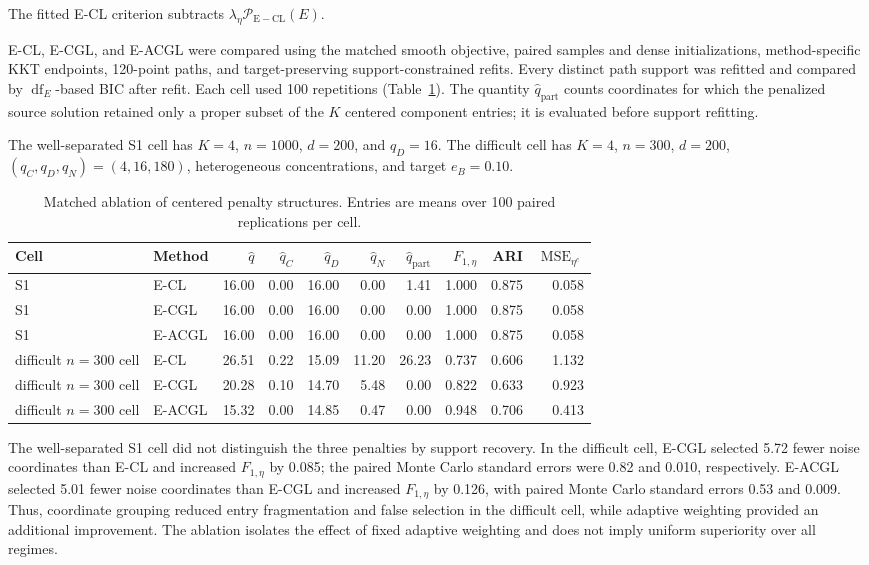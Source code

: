 \documentclass[preprint,12pt,authoryear]{elsarticle}
\begin{document}
The fitted E-CL criterion subtracts
$\lambda_\eta\mathcal P_{\mathrm{E-CL}}(E)$.

E-CL, E-CGL, and E-ACGL were compared using the matched smooth
objective, paired samples and dense initializations, method-specific KKT
endpoints, 120-point paths, and target-preserving support-constrained refits.
Every distinct path support was refitted and compared by
$\operatorname{df}_E$-based BIC after refit. Each cell used
100 repetitions (Table~\ref{tab:s-penalty-ablation}). The quantity
$\widehat q_{\mathrm{part}}$ counts coordinates for which the penalized source
solution retained only a proper subset of the $K$ centered component entries;
it is evaluated before support refitting.

The well-separated S1 cell has $K=4$, $n=1000$, $d=200$, and
$q_D=16$. The difficult cell has $K=4$, $n=300$, $d=200$,
$(q_C,q_D,q_N)=(4,16,180)$, heterogeneous concentrations, and target
$e_B=0.10$.

\begin{table}[H]
\centering
\footnotesize
\setlength{\tabcolsep}{2.5pt}
\caption{Matched ablation of centered penalty structures. Entries are means
over 100 paired replications per cell.}
\label{tab:s-penalty-ablation}
\begin{tabular*}{\textwidth}{@{\extracolsep{\fill}}llrrrrrrrr@{}}
\toprule
Cell & Method & $\widehat q$ & $\widehat q_C$ & $\widehat q_D$ & $\widehat q_N$ & $\widehat q_{\mathrm{part}}$ & $F_{1,\eta}$ & ARI & $\operatorname{MSE}_{\eta^c}$ \\
\midrule
S1 & E-CL & 16.00 & 0.00 & 16.00 & 0.00 & 1.41 & 1.000 & 0.875 & 0.058 \\
S1 & E-CGL & 16.00 & 0.00 & 16.00 & 0.00 & 0.00 & 1.000 & 0.875 & 0.058 \\
S1 & E-ACGL & 16.00 & 0.00 & 16.00 & 0.00 & 0.00 & 1.000 & 0.875 & 0.058 \\
difficult $n=300$ cell & E-CL & 26.51 & 0.22 & 15.09 & 11.20 & 26.23 & 0.737 & 0.606 & 1.132 \\
difficult $n=300$ cell & E-CGL & 20.28 & 0.10 & 14.70 & 5.48 & 0.00 & 0.822 & 0.633 & 0.923 \\
difficult $n=300$ cell & E-ACGL & 15.32 & 0.00 & 14.85 & 0.47 & 0.00 & 0.948 & 0.706 & 0.413 \\
\bottomrule
\end{tabular*}
\end{table}

The well-separated S1 cell did not distinguish the three penalties by support
recovery. In the difficult cell, E-CGL selected 5.72 fewer noise coordinates
than E-CL and increased $F_{1,\eta}$ by 0.085; the paired Monte Carlo standard errors
were 0.82 and 0.010, respectively. E-ACGL selected 5.01 fewer noise
coordinates than E-CGL and increased $F_{1,\eta}$ by 0.126, with paired Monte Carlo
standard errors 0.53 and 0.009. Thus, coordinate grouping reduced entry
fragmentation and false selection in the difficult cell, while adaptive
weighting provided an additional improvement. The ablation isolates the
effect of fixed adaptive weighting and does not imply uniform superiority
over all regimes.
\end{document}
